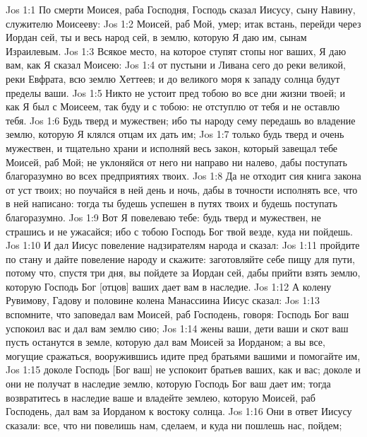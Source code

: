\vs Jos 1:1 По смерти Моисея, раба Господня, Господь сказал Иисусу, сыну Навину, служителю Моисееву:
\vs Jos 1:2 Моисей, раб Мой, умер; итак встань, перейди через Иордан сей, ты и весь народ сей, в землю, которую Я даю им, сынам Израилевым.
\vs Jos 1:3 Всякое место, на которое ступят стопы ног ваших, Я даю вам, как Я сказал Моисею:
\vs Jos 1:4 от пустыни и Ливана сего до реки великой, реки Евфрата, всю землю Хеттеев; и до великого моря к западу солнца будут пределы ваши.
\vs Jos 1:5 Никто не устоит пред тобою во все дни жизни твоей; и как Я был с Моисеем, так буду и с тобою: не отступлю от тебя и не оставлю тебя.
\vs Jos 1:6 Будь тверд и мужествен; ибо ты народу сему передашь во владение землю, которую Я клялся отцам их дать им;
\vs Jos 1:7 только будь тверд и очень мужествен, и тщательно храни и исполняй весь закон, который завещал тебе Моисей, раб Мой; не уклоняйся от него ни направо ни налево, дабы поступать благоразумно во всех предприятиях твоих.
\vs Jos 1:8 Да не отходит сия книга закона от уст твоих; но поучайся в ней день и ночь, дабы в точности исполнять все, что в ней написано: тогда ты будешь успешен в путях твоих и будешь поступать благоразумно.
\vs Jos 1:9 Вот Я повелеваю тебе: будь тверд и мужествен, не страшись и не ужасайся; ибо с тобою Господь Бог твой везде, куда ни пойдешь.
\rsbpar\vs Jos 1:10 И дал Иисус повеление надзирателям народа и сказал:
\vs Jos 1:11 пройдите по стану и дайте повеление народу и скажите: заготовляйте себе пищу для пути, потому что, спустя три дня, вы пойдете за Иордан сей, дабы прийти взять землю, которую Господь Бог [отцов] ваших дает вам в наследие.
\vs Jos 1:12 А колену Рувимову, Гадову и половине колена Манассиина Иисус сказал:
\vs Jos 1:13 вспомните, что заповедал вам Моисей, раб Господень, говоря: Господь Бог ваш успокоил вас и дал вам землю сию;
\vs Jos 1:14 жены ваши, дети ваши и скот ваш пусть останутся в земле, которую дал вам Моисей за Иорданом; а вы все, могущие сражаться, вооружившись идите пред братьями вашими и помогайте им,
\vs Jos 1:15 доколе Господь [Бог ваш] не успокоит братьев ваших, как и вас; доколе и они не получат в наследие землю, которую Господь Бог ваш дает им; тогда возвратитесь в наследие ваше и владейте землею, которую Моисей, раб Господень, дал вам за Иорданом к востоку солнца.
\vs Jos 1:16 Они в ответ Иисусу сказали: все, что ни повелишь нам, сделаем, и куда ни пошлешь нас, пойдем;
